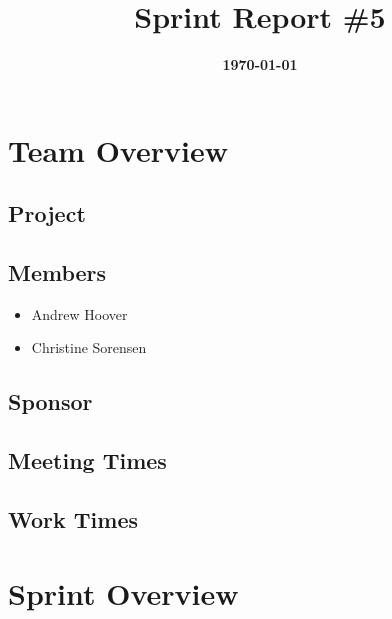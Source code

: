 \documentclass{article}
\title{\normalfont\Large\bfseries\color{TitleColor}Sprint Report \#5}
\date{\normalfont\bfseries\color{TitleColor}\today}
\begin{document}
\maketitle

\section*{Team Overview}
\subsection*{Project}

\subsection*{Members}
\begin{itemize}
	\item Andrew Hoover
	\item Christine Sorensen
\end{itemize}

\subsection*{Sponsor}

\subsection*{Meeting Times}
\subsection*{Work Times}

\section*{Sprint Overview}
\end{document}

